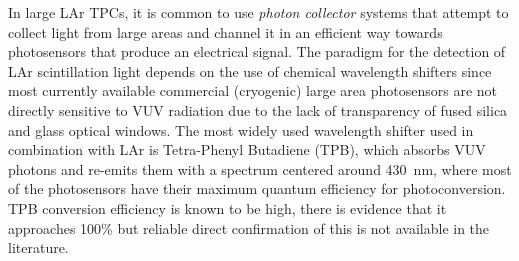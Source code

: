 In large LAr TPCs, it is common to use {\it photon collector} systems that attempt to 
collect light from large areas and channel it in an efficient way towards  
photosensors that produce an electrical signal.
The paradigm for the detection of LAr scintillation light depends on the use of 
chemical wavelength shifters since most currently available commercial (cryogenic) large area photosensors are not 
directly sensitive to VUV radiation due to the lack of transparency of fused silica and 
glass optical windows. The most widely used wavelength shifter used in 
combination with LAr is Tetra-Phenyl Butadiene (TPB), which absorbs VUV photons 
and re-emits them with a spectrum centered around \SI{430}{nm}, where most of the 
photosensors have their maximum quantum efficiency for photoconversion. 
TPB conversion efficiency is known to be high, there is evidence that 
it approaches 100\% but reliable direct confirmation of this is not available in the literature.


